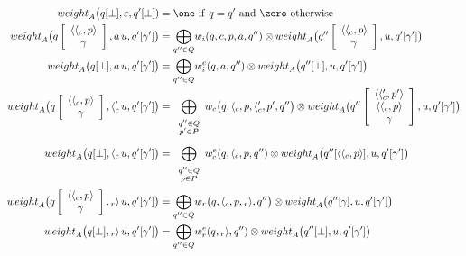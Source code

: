 \begin{align}
%
\weight_A\bigl(\config{q}{\bot}, \varepsilon, \config{q'}{\bot}) & = \one
\mathrm{~if~} q = q' \mathrm{~and~} \zero \mathrm{~otherwise}\label{eq:SWVPA-weight}\\
\weight_A\bigl(\configup{q}{\<{\call{c}}, p>\stackup\gamma}, a\, u, 
               \config{q'}{\gamma'}\bigr) & =  
 {\displaystyle\bigoplus_{q'' \in Q}} \weii(q, c, p, a, q'') 
  \otimes \weight_A\bigl(\configup{q''}{\<{\call{c}}, p> \stackup \gamma}, u, 
                         \config{q'}{\gamma'}\bigr)\nonumber\\
%
\weight_A\bigl(\config{q}{\bot}, a\, u, 
               \config{q'}{\gamma'}\bigr) & =  
  {\displaystyle\bigoplus_{q'' \in Q}} \weiei(q, a, q'') 
   \otimes \weight_A\bigl(\config{q''}{\bot}, u, \config{q'}{\gamma'}\bigr)\nonumber\\
%
\weight_A\bigl(\configup{q}{\<{\call{c}}, p>\stackup\gamma}, {\call{c}'}\, u, 
               \config{q'}{\gamma'}\bigr) & =  
 {\displaystyle\bigoplus_{\begin{array}{c}
                          \scriptstyle q'' \in Q\\[-1ex]
                          \scriptstyle p' \in P
                          \end{array}}}
 \weic\bigl(q, {\call{c}}, p, {\call{c}'}, p', q''\bigr) 
 \otimes \weight_A\bigl(\configup{q''}{\<{\call{c}'}, p'>\stackup \<{\call{c}}, p>\stackup \gamma}, u, 
                        \config{q'}{\gamma'}\bigr)\nonumber\\[1mm]
%
\weight_A\bigl(\config{q}{\bot}, {\call{c}}\, u, 
               \config{q'}{\gamma'}\bigr) & =  
 {\displaystyle\bigoplus_{\begin{array}{c}
                          \scriptstyle q'' \in Q\\[-1ex]
                          \scriptstyle p \in P
                          \end{array}}}
  \weiec(q, {\call{c}}, p, q'') 
  \otimes \weight_A\bigl(\config{q''}{\<{\call{c}}, p>}, u, 
                         \config{q'}{\gamma'}\bigr)\nonumber\\
%
\weight_A\bigl(\configup{q}{\<{\call{c}}, p>\stackup\gamma}, {\return{r}}\, u, 
               \config{q'}{\gamma'}\bigr) & =  
 {\displaystyle\bigoplus_{q'' \in Q}} 
  \weir\bigl(q, {\call{c}}, p, {\return{r}}, q''\bigr) 
  \otimes \weight_A\bigl(\config{q''}{\gamma}, u, 
                         \config{q'}{\gamma'}\bigr)\nonumber\\
%
\weight_A\bigl(\config{q}{\bot}, {\return{r}}\, u, 
               \config{q'}{\gamma'}\bigr) & =  
 {\displaystyle\bigoplus_{q'' \in Q}} \weier(q, {\return{r}}, q'') 
  \otimes \weight_A\bigl(\config{q''}{\bot}, u, 
                         \config{q'}{\gamma'}\bigr)\nonumber
\end{align}
